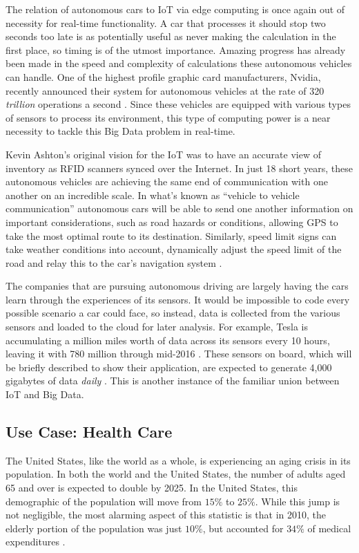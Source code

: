 \documentclass[sigconf]{acmart}
\begin{document}
The relation of autonomous cars to IoT via edge computing is once again out of necessity for real-time functionality. A car that processes it should stop two seconds too late is as potentially useful as never making the calculation in the first place, so timing is of the utmost importance. Amazing progress has already been made in the speed and complexity of calculations these autonomous vehicles can handle. One of the highest profile graphic card manufacturers, Nvidia, recently announced their system for autonomous vehicles at the rate of 320 \emph{trillion} operations a second \cite{nvidia}. Since these vehicles are equipped with various types of sensors to process its environment, this type of computing power is a near necessity to tackle this Big Data problem in real-time. 

Kevin Ashton's original vision for the IoT was to have an accurate view of inventory as RFID scanners synced over the Internet. In just 18 short years, these autonomous vehicles are achieving the same end of communication with one another on an incredible scale. In what's known as ``vehicle to vehicle communication'' autonomous cars will be able to send one another information on important considerations, such as road hazards or conditions, allowing GPS to take the most optimal route to its destination. Similarly, speed limit signs can take weather conditions into account, dynamically adjust the speed limit of the road and relay this to the car's navigation system \cite{vehiclecomm}. 

The companies that are pursuing autonomous driving are largely having the cars learn through the experiences of its sensors. It would be impossible to code every possible scenario a car could face, so instead, data is collected from the various sensors and loaded to the cloud for later analysis. For example, Tesla is accumulating a million miles worth of data across its sensors every 10 hours, leaving it with 780 million through mid-2016 \cite{tesla}. These sensors on board, which will be briefly described to show their application, are expected to generate 4,000 gigabytes of data \emph{daily} \cite{sensorcardata} \cite{howsensorswork}. This is another instance of the familiar union between IoT and Big Data. 

\subsection{Use Case: Health Care}

The United States, like the world as a whole, is experiencing an aging crisis in its population. In both the world and the United States, the number of adults aged 65 and over is expected to double by 2025. In the United States, this demographic of the population will move from $15\%$ to $25\%$. While this jump is not negligible, the most alarming aspect of this statistic is that in 2010, the elderly portion of the population was just $10\%$, but accounted for $34 \%$ of medical expenditures \cite{elderlypop}. 
\end{document}
